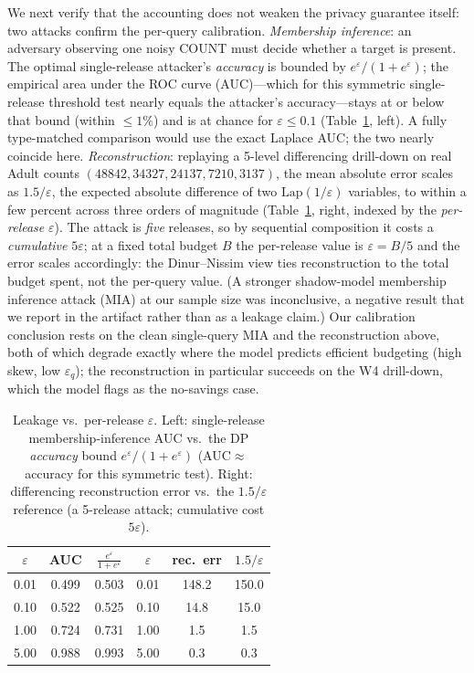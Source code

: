 \documentclass[sigconf,nonacm]{acmart}
\newcommand{\eps}{\varepsilon}
\newcommand{\Lap}{\mathrm{Lap}}
\begin{document}
We next verify that the accounting does not weaken the privacy guarantee itself: two attacks confirm the per-query calibration. \emph{Membership inference}: an adversary observing one noisy COUNT must decide whether a target is present. The optimal single-release attacker's \emph{accuracy} is bounded by $e^\eps/(1+e^\eps)$; the empirical area under the ROC curve (AUC)---which for this symmetric single-release threshold test nearly equals the attacker's accuracy---stays at or below that bound (within $\le1\%$) and is at chance for $\eps\le0.1$ (Table~\ref{tab:leak}, left). A fully type-matched comparison would use the exact Laplace AUC; the two nearly coincide here. \emph{Reconstruction}: replaying a 5-level differencing drill-down on real Adult counts $(48842,34327,24137,7210,3137)$, the mean absolute error scales as $1.5/\eps$, the expected absolute difference of two $\Lap(1/\eps)$ variables, to within a few percent across three orders of magnitude (Table~\ref{tab:leak}, right, indexed by the \emph{per-release} $\eps$). The attack is \emph{five} releases, so by sequential composition it costs a \emph{cumulative} $5\eps$; at a fixed total budget $B$ the per-release value is $\eps{=}B/5$ and the error scales accordingly: the Dinur--Nissim view ties reconstruction to the total budget spent, not the per-query value. (A stronger shadow-model membership inference attack (MIA) at our sample size was inconclusive, a negative result that we report in the artifact rather than as a leakage claim.) Our calibration conclusion rests on the clean single-query MIA and the reconstruction above, both of which degrade exactly where the model predicts efficient budgeting (high skew, low $\eps_q$); the reconstruction in particular succeeds on the W4 drill-down, which the model flags as the no-savings case.

\begin{table}[h]
\footnotesize\centering
\caption{Leakage vs.\ per-release $\eps$. Left: single-release membership-inference AUC vs.\ the DP \emph{accuracy} bound $e^\eps/(1+e^\eps)$ (AUC$\approx$accuracy for this symmetric test). Right: differencing reconstruction error vs.\ the $1.5/\eps$ reference (a 5-release attack; cumulative cost $5\eps$).}
\label{tab:leak}
\begin{tabular}{c|cc||c|cc}
\toprule
$\eps$ & AUC & $\frac{e^\eps}{1+e^\eps}$ & $\eps$ & rec.\ err & $1.5/\eps$ \\
\midrule
0.01 & 0.499 & 0.503 & 0.01 & 148.2 & 150.0 \\
0.10 & 0.522 & 0.525 & 0.10 & 14.8 & 15.0 \\
1.00 & 0.724 & 0.731 & 1.00 & 1.5 & 1.5 \\
5.00 & 0.988 & 0.993 & 5.00 & 0.3 & 0.3 \\
\bottomrule
\end{tabular}
\end{table}
\end{document}
